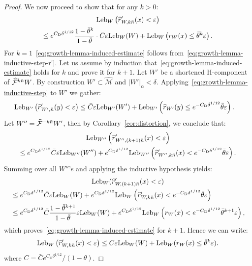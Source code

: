 \documentclass[AHL, Unicode, longabstracts,published]{cedram}
\newcommand{\eps}{\varepsilon}
\newcommand{\ifrac}[2]{#1/#2}
\newcommand{\cm}{\mathcal{F}}
\newcommand{\csp}{\mathcal{M}}
\newcommand{\cmp}{\hat\cm}
\newcommand{\cspi}{\widehat{\csp}}
\newcommand{\adm}{_{\alpha^{+}}}
\newcommand{\Leb}{\textup{Leb}}
\newcommand{\Cdist}{C_\mathrm{D}}
\renewcommand{\adm}{_{\alpha}}
\let\oldhat\hat
\renewcommand*{\hat}[1]{\mathchoice{\widehat{#1}}{\widehat{#1}}{\oldhat{#1}}{\oldhat{#1}}}
\begin{document}
\begin{proof}
We now proceed to show that for any $k > 0$:
\begin{multline}\label{eq:growth-lemma-induced-estimate}
\Leb_{W}\left(\hat r'_{W,k\bar n}(x) < \eps\right) \\
\le e^{\Cdist\delta^{1/12}}\frac{1-\bar\theta^{k}}{1-\bar\theta}\cdot
\bar C\eps\Leb_{W}(W)+ \Leb_{W}\left(r_{W}(x) \le\bar \theta^{k}\eps\right).
\end{multline}
For $k = 1$~\eqref{eq:growth-lemma-induced-estimate} follows from~\eqref{eq:growth-lemma-inductive-step-r'}. Let us assume by induction that~\eqref{eq:growth-lemma-induced-estimate} holds for $k$ and prove it for $k+1$. Let $W' $ be a shortened H-component of $\cmp^{k\bar n} W$. By construction $W'\subset\cspi$ and $|W'|\adm < \delta$. Applying~\eqref{eq:growth-lemma-inductive-step} to $W'$ we gather:
\begin{align*}
\Leb_{W'}\left(\hat r'_{W',\bar n}(y) < \eps\right) &\le \bar C\eps\Leb_{W'}(W') +
\Leb_{W'}\left(\hat r_{W'}(y)\le e^{-\Cdist\delta^{1/12}}\bar\theta\eps\right).
\end{align*}
Let $W'' = \cmp^{-k\bar n} W'$, then by Corollary~\ref{cor:distortion}, we conclude that:
\begin{multline*}
\Leb_{W''}\left(\hat r'_{W'',(k+1)\bar n}(x) < \eps\right) \\
\le e^{\Cdist\delta^{1/12}}\bar C\eps\Leb_{W''}(W'')
 + e^{\Cdist\delta^{1/12}}\Leb_{W''} \left(\hat r'_{W'',k\bar n}(x) < e^{-\Cdist\delta^{1/12}}\bar \theta\eps\right).
\end{multline*}
Summing over all $W''$'s and applying the inductive hypothesis yields:
\begin{multline*}
\Leb_{W}(\hat r'_{W,(k+1)\bar n}(x) < \eps) 
\\
\begin{aligned}
&\le e^{\Cdist\delta^{1/12}}\bar C\eps\Leb_{W}(W)+
e^{\Cdist\delta^{1/12}}\Leb_{W}
\left(\hat r'_{W,k\bar n}(x) < e^{-\Cdist\delta^{1/12}}\bar\theta\eps\right) 
\\
&\le
e^{\Cdist\delta^{1/12}}\bar C\frac{1-\bar\theta^{k+1}}{1-\bar\theta}\eps\Leb_{W}(W)+
e^{\Cdist\delta^{1/12}}\Leb_{W} \left(r_{W}(x) < e^{-\Cdist\delta^{1/12}}\bar\theta^{k+1}\eps\right),
\end{aligned}
\end{multline*}
which proves~\eqref{eq:growth-lemma-induced-estimate} for $k+1$. Hence we can write:
\begin{align}\label{eq:growth-lemma-final-estimate}
\Leb_{W}\left(\hat r'_{W,k\bar n}(x) < \eps\right)\le C\eps\Leb_{W}(W)+\Leb_{W}(r_{W}(x) \le \bar\theta^{k}\eps).
\end{align}
where $C = \ifrac{\bar C e^{\Cdist\delta^{1/12}}}{(1-\theta)}$.


\end{proof}
\end{document}
